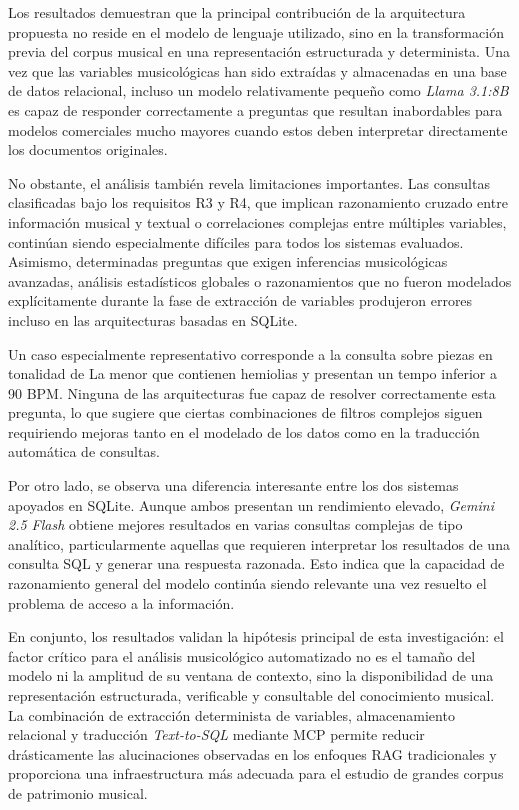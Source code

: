 Los resultados demuestran que la principal contribución de la arquitectura propuesta no reside en el modelo de lenguaje utilizado, sino en la transformación previa del corpus musical en una representación estructurada y determinista. Una vez que las variables musicológicas han sido extraídas y almacenadas en una base de datos relacional, incluso un modelo relativamente pequeño como \textit{Llama 3.1:8B} es capaz de responder correctamente a preguntas que resultan inabordables para modelos comerciales mucho mayores cuando estos deben interpretar directamente los documentos originales.

No obstante, el análisis también revela limitaciones importantes. Las consultas clasificadas bajo los requisitos R3 y R4, que implican razonamiento cruzado entre información musical y textual o correlaciones complejas entre múltiples variables, continúan siendo especialmente difíciles para todos los sistemas evaluados. Asimismo, determinadas preguntas que exigen inferencias musicológicas avanzadas, análisis estadísticos globales o razonamientos que no fueron modelados explícitamente durante la fase de extracción de variables produjeron errores incluso en las arquitecturas basadas en SQLite.

Un caso especialmente representativo corresponde a la consulta sobre piezas en tonalidad de La menor que contienen hemiolias y presentan un tempo inferior a 90 BPM. Ninguna de las arquitecturas fue capaz de resolver correctamente esta pregunta, lo que sugiere que ciertas combinaciones de filtros complejos siguen requiriendo mejoras tanto en el modelado de los datos como en la traducción automática de consultas.

Por otro lado, se observa una diferencia interesante entre los dos sistemas apoyados en SQLite. Aunque ambos presentan un rendimiento elevado, \textit{Gemini 2.5 Flash} obtiene mejores resultados en varias consultas complejas de tipo analítico, particularmente aquellas que requieren interpretar los resultados de una consulta SQL y generar una respuesta razonada. Esto indica que la capacidad de razonamiento general del modelo continúa siendo relevante una vez resuelto el problema de acceso a la información.

En conjunto, los resultados validan la hipótesis principal de esta investigación: el factor crítico para el análisis musicológico automatizado no es el tamaño del modelo ni la amplitud de su ventana de contexto, sino la disponibilidad de una representación estructurada, verificable y consultable del conocimiento musical. La combinación de extracción determinista de variables, almacenamiento relacional y traducción \textit{Text-to-SQL} mediante MCP permite reducir drásticamente las alucinaciones observadas en los enfoques RAG tradicionales y proporciona una infraestructura más adecuada para el estudio de grandes corpus de patrimonio musical.
